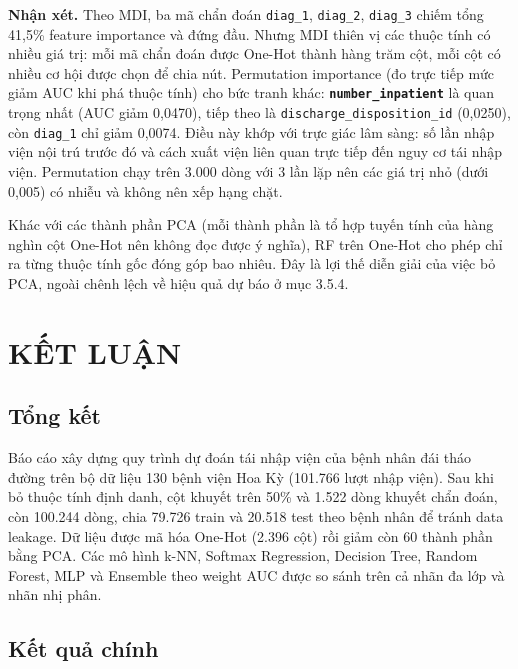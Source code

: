 \documentclass[a4paper]{report}
\begin{document}
\textbf{Nhận xét.} Theo MDI, ba mã chẩn đoán \texttt{diag\_\allowbreak{}1}, \texttt{diag\_\allowbreak{}2}, \texttt{diag\_\allowbreak{}3} chiếm tổng 41,5\% feature importance và đứng đầu. Nhưng MDI thiên vị các thuộc tính có nhiều giá trị: mỗi mã chẩn đoán được One-Hot thành hàng trăm cột, mỗi cột có nhiều cơ hội được chọn để chia nút. Permutation importance (đo trực tiếp mức giảm AUC khi phá thuộc tính) cho bức tranh khác: \textbf{\texttt{number\_\allowbreak{}inpatient}} là quan trọng nhất (AUC giảm 0,0470), tiếp theo là \texttt{discharge\_\allowbreak{}disposition\_\allowbreak{}id} (0,0250), còn \texttt{diag\_\allowbreak{}1} chỉ giảm 0,0074. Điều này khớp với trực giác lâm sàng: số lần nhập viện nội trú trước đó và cách xuất viện liên quan trực tiếp đến nguy cơ tái nhập viện. Permutation chạy trên 3.000 dòng với 3 lần lặp nên các giá trị nhỏ (dưới 0,005) có nhiễu và không nên xếp hạng chặt.

Khác với các thành phần PCA (mỗi thành phần là tổ hợp tuyến tính của hàng nghìn cột One-Hot nên không đọc được ý nghĩa), RF trên One-Hot cho phép chỉ ra từng thuộc tính gốc đóng góp bao nhiêu. Đây là lợi thế diễn giải của việc bỏ PCA, ngoài chênh lệch về hiệu quả dự báo ở mục 3.5.4.


\section{KẾT LUẬN}

\subsection{Tổng kết}

Báo cáo xây dựng quy trình dự đoán tái nhập viện của bệnh nhân đái tháo đường trên bộ dữ liệu 130 bệnh viện Hoa Kỳ (101.766 lượt nhập viện). Sau khi bỏ thuộc tính định danh, cột khuyết trên 50\% và 1.522 dòng khuyết chẩn đoán, còn 100.244 dòng, chia 79.726 train và 20.518 test theo bệnh nhân để tránh data leakage. Dữ liệu được mã hóa One-Hot (2.396 cột) rồi giảm còn 60 thành phần bằng PCA. Các mô hình k-NN, Softmax Regression, Decision Tree, Random Forest, MLP và Ensemble theo weight AUC được so sánh trên cả nhãn đa lớp và nhãn nhị phân.

\subsection{Kết quả chính}
\end{document}
